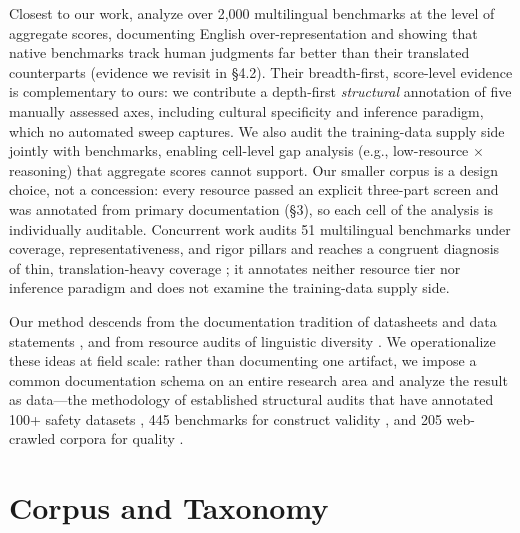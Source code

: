 \documentclass[letterpaper]{article} %
\begin{document}
Closest to our work, \citet{wu2025bitter} analyze over 2{,}000 multilingual benchmarks at the level of aggregate scores, documenting English over-representation and showing that native benchmarks track human judgments far better than their translated counterparts (evidence we revisit in \S4.2). Their breadth-first, score-level evidence is complementary to ours: we contribute a depth-first \emph{structural} annotation of five manually assessed axes, including cultural specificity and inference paradigm, which no automated sweep captures. We also audit the training-data supply side jointly with benchmarks, enabling cell-level gap analysis (e.g., low-resource $\times$ reasoning) that aggregate scores cannot support. Our smaller corpus is a design choice, not a concession: every resource passed an explicit three-part screen and was annotated from primary documentation (\S3), so each cell of the analysis is individually auditable. Concurrent work audits 51 multilingual benchmarks under coverage, representativeness, and rigor pillars and reaches a congruent diagnosis of thin, translation-heavy coverage \cite{uppadhyay2026state}; it annotates neither resource tier nor inference paradigm and does not examine the training-data supply side.
 
Our method descends from the documentation tradition of datasheets \cite{gebru2021datasheets} and data statements \cite{bender2018data}, and from resource audits of linguistic diversity \cite{joshi2020state}. We operationalize these ideas at field scale: rather than documenting one artifact, we impose a common documentation schema on an entire research area and analyze the result as data---the methodology of established structural audits that have annotated 100+ safety datasets \cite{rottger2025safetyprompts}, 445 benchmarks for construct validity \cite{bean2025measuring}, and 205 web-crawled corpora for quality \cite{kreutzer-etal-2022-quality}.





\section{Corpus and Taxonomy}
\end{document}
